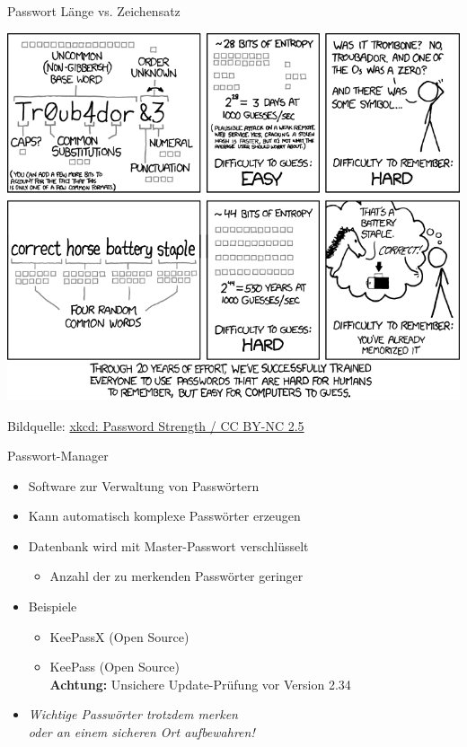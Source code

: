 \begin{frame}{Passwort Länge vs. Zeichensatz}
  \begin{center}
    \includegraphics[width=0.99\textheight]{images/password_strength.png}\\
  \end{center}
  \tiny Bildquelle: \href{http://xkcd.com/936/}{xkcd: Password Strength / CC BY-NC 2.5}
\end{frame}

\begin{frame}{Passwort-Manager}
  \begin{itemize}
    \item Software zur Verwaltung von Passwörtern
    \item Kann automatisch komplexe Passwörter erzeugen
    \item Datenbank wird mit Master-Passwort verschlüsselt
    \begin{itemize}
      \item Anzahl der zu merkenden Passwörter geringer
    \end{itemize}
    \item Beispiele
    \begin{itemize}
      \item KeePassX (Open Source)
      \item KeePass (Open Source)\\
        \textbf{Achtung:} Unsichere Update-Prüfung vor Version 2.34
    \end{itemize}
  \end{itemize}
  \begin{itemize}
    \item \emph{Wichtige Passwörter trotzdem merken\\oder an einem sicheren Ort aufbewahren!}
  \end{itemize}
\end{frame}

\endinput

